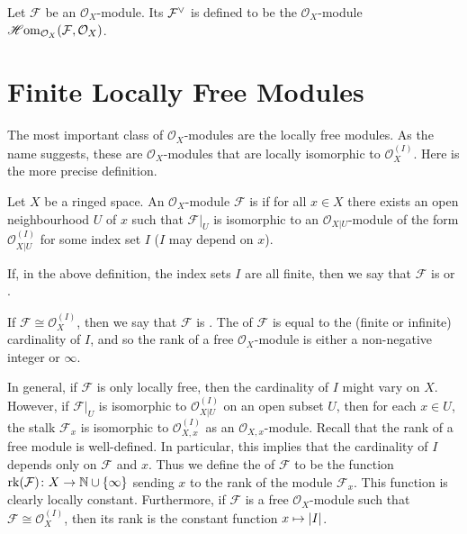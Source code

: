\begin{definition}
	Let $\mathcal{F}$ be an $\mathcal{O}_X$-module. Its  $\mathcal{F}^\vee$ is defined to be the $\mathcal{O}_X$-module $\operatorname{\mathscr{H}om}_{\mathcal{O}_{X}}(\mathcal{F}, \mathcal{O}_X)$.
\end{definition}

\section{Finite Locally Free Modules}

The most important class of $\mathcal{O}_X$-modules are the locally free modules. As the name suggests, these are $\mathcal{O}_X$-modules that are locally isomorphic to $\mathcal{O}_X^{(I)}$. Here is the more precise definition.

\begin{definition}
	Let $X$ be a ringed space. An $\mathcal{O}_X$-module $\mathcal{F}$ is  if for all $x \in X$ there exists an open neighbourhood $U$ of $x$ such that $\mathcal{F}|_{U}$ is isomorphic to an $\mathcal{O}_{X|U}$-module of the form $\mathcal{O}_{X|U}^{(I)}$ for some index set $I$ ($I$ may depend on $x$).
	
	If, in the above definition, the index sets $I$ are all finite, then we say that $\mathcal{F}$ is  or .
\end{definition}

If $\mathcal{F} \cong \mathcal{O}_X^{(I)}$, then we say that $\mathcal{F}$ is . The  of $\mathcal{F}$ is equal to the (finite or infinite) cardinality of $I$, and so the rank of a free $\mathcal{O}_X$-module is either a non-negative integer or $\infty$.

In general, if $\mathcal{F}$ is only locally free, then the cardinality of $I$ might vary on $X$. However, if $\mathcal{F}|_{U}$ is isomorphic to $\mathcal{O}_{X|U}^{(I)}$ on an open subset $U$, then for each $x \in U$, the stalk $\mathcal{F}_x$ is isomorphic to $\mathcal{O}_{X, x}^{(I)}$ as an $\mathcal{O}_{X, x}$-module. Recall that the rank of a free module is well-defined. In particular, this implies that the cardinality of $I$ depends only on $\mathcal{F}$ and $x$. Thus we define the  of $\mathcal{F}$ to be the function $\operatorname{rk}(\mathcal{F}) \colon X \to \mathbb N \cup \lbrace\infty\rbrace$ sending $x$ to the rank of the module $\mathcal{F}_x$. This function is clearly locally constant. Furthermore, if $\mathcal{F}$ is a free $\mathcal{O}_X$-module such that $\mathcal{F} \cong \mathcal{O}_X^{(I)}$, then its rank is the constant function $x \mapsto \lvert I\rvert$.

